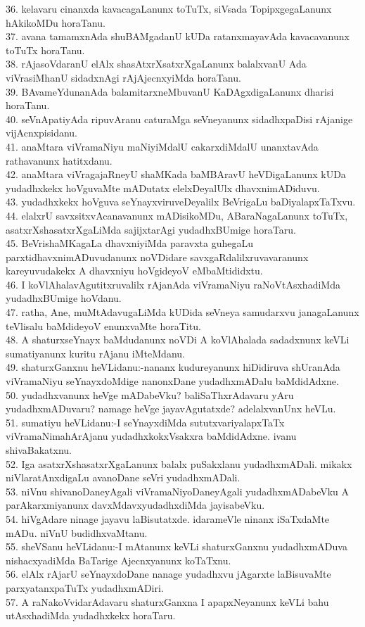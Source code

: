 \documentclass{article}
\begin{document}
36. kelavaru cinanxda kavacagaLanunx toTuTx, siVsada TopipxgegaLanunx hAkikoMDu horaTanu.\\
37. avana tamamxnAda shuBAMgadanU kUDa ratanxmayavAda kavacavanunx toTuTx horaTanu.\\
38. rAjasoVdaranU elAlx shasAtxrXsatxrXgaLanunx balalxvanU Ada viVrasiMhanU sidadxnAgi rAjAjecnxyiMda horaTanu.\\
39. BAvameYdunanAda balamitarxneMbuvanU KaDAgxdigaLanunx dharisi horaTanu.\\
40. seVnApatiyAda ripuvAranu caturaMga seVneyanunx sidadhxpaDisi rAjanige vijAcnxpisidanu.\\
41. anaMtara viVramaNiyu maNiyiMdalU cakarxdiMdalU unanxtavAda rathavanunx hatitxdanu.\\
42. anaMtara viVragajaRneyU shaMKada baMBAravU heVDigaLanunx kUDa yudadhxkekx hoVguvaMte mADutatx elelxDeyalUlx dhavxnimADiduvu.\\
43. yudadhxkekx hoVguva seYnayxviruveDeyalilx BeVrigaLu baDiyalapxTaTxvu.\\
44. elalxrU savxsitxvAcanavanunx mADisikoMDu, ABaraNagaLanunx toTuTx, asatxrXshasatxrXgaLiMda sajijxtarAgi yudadhxBUmige horaTaru.\\
45. BeVrishaMKagaLa dhavxniyiMda paravxta guhegaLu parxtidhavxnimADuvudanunx noVDidare savxgaRdalilxruvavaranunx kareyuvudakekx A dhavxniyu hoVgideyoV eMbaMtididxtu.\\
46. I koVlAhalavAgutitxruvalilx rAjanAda viVramaNiyu raNoVtAsxhadiMda yudadhxBUmige hoVdanu.\\
47. ratha, Ane, muMtAdavugaLiMda kUDida seVneya samudarxvu janagaLanunx teVlisalu baMdideyoV enunxvaMte horaTitu.\\
48. A shaturxseYnayx baMdudanunx noVDi A koVlAhalada sadadxnunx keVLi sumatiyanunx kuritu rAjanu iMteMdanu.\\
49. shaturxGanxnu heVLidanu:-nananx kudureyanunx hiDidiruva shUranAda viVramaNiyu seYnayxdoMdige nanonxDane yudadhxmADalu baMdidAdxne.\\
50. yudadhxvanunx heVge mADabeVku? baliSaThxrAdavaru yAru yudadhxmADuvaru? namage heVge jayavAgutatxde? adelalxvanUnx heVLu.\\
51. sumatiyu heVLidanu:-I seYnayxdiMda sututxvariyalapxTaTx viVramaNimahArAjanu yudadhxkokxVsakxra baMdidAdxne. ivanu shivaBakatxnu.\\
52. Iga asatxrXshasatxrXgaLanunx balalx puSakxlanu yudadhxmADali. mikakx niVlaratAnxdigaLu avanoDane seVri yudadhxmADali.\\
53. niVnu shivanoDaneyAgali viVramaNiyoDaneyAgali yudadhxmADabeVku A parAkarxmiyanunx davxMdavxyudadhxdiMda jayisabeVku.\\
54. hiVgAdare ninage jayavu laBisutatxde. idarameVle ninanx iSaTxdaMte mADu. niVnU budidhxvaMtanu.\\
55. sheVSanu heVLidanu:-I mAtanunx keVLi shaturxGanxnu yudadhxmADuva nishacxyadiMda BaTarige Ajecnxyanunx koTaTxnu.\\
56. elAlx rAjarU seYnayxdoDane nanage yudadhxvu jAgarxte laBisuvaMte parxyatanxpaTuTx yudadhxmADiri.\\
57. A raNakoVvidarAdavaru shaturxGanxna I apapxNeyanunx keVLi bahu utAsxhadiMda yudadhxkekx horaTaru.
\end{document}
